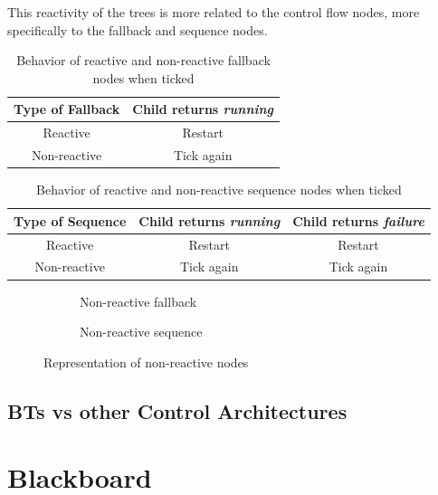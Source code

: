 This reactivity of the trees is more related to the control flow nodes, more specifically to the fallback and sequence nodes.

\begin{table}[h]
    \centering
    \begin{tabular}{c c}
        \toprule
        Type of Fallback & Child returns \textit{running} \\
        \midrule
        Reactive         & Restart                        \\
        Non-reactive     & Tick again                     \\
        \bottomrule
   \end{tabular}
   \caption{Behavior of reactive and non-reactive fallback nodes when ticked}
   \label{tab:fallback_reactivity}
\end{table}

\begin{table}[h]
    \centering
    \begin{tabular}{c c c}
        \toprule
        Type of Sequence & Child returns \textit{running} & Child returns \textit{failure} \\
        \midrule
        Reactive         & Restart                        & Restart                        \\
        Non-reactive     & Tick again                     & Tick again                     \\
        \bottomrule
    \end{tabular}
    \caption{Behavior of reactive and non-reactive sequence nodes when ticked}
    \label{tab:sequence_reactivity}
\end{table}

\begin{figure}[!h]
    \centering
    \begin{subfigure}[b]{.49\linewidth}
        \centering
        \scalebox{1.0} {
            \begin{forest}
            \end{forest}
        }
        \caption{Non-reactive fallback}
    \end{subfigure}
    \hfill
    \begin{subfigure}[b]{.49\linewidth}
        \centering
        \scalebox{1.0} {
            \begin{forest}
            \end{forest}
        }
        \caption{Non-reactive sequence}
    \end{subfigure}
    \caption{Representation of non-reactive nodes}
    \label{fig:control_nodes_spec}
\end{figure}

\subsection{BTs vs other Control Architectures}

\section{Blackboard}

\cite{BlackboardDesignPattern}
